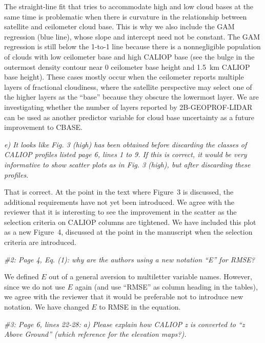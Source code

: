 \documentclass[12pt,a4paper]{responses}
\begin{document}
The straight-line fit that tries to accommodate high and low cloud bases at the
same time is problematic when there is curvature in the relationship between
satellite and ceilometer cloud base.  This is why we also include the GAM
regression (blue line), whose slope and intercept need not be constant.  The GAM
regression is still below the 1-to-1 line because there is a nonnegligible
population of clouds with low ceilometer base and high CALIOP base (see the
bulge in the outermost density contour near 0 ceilometer base height and 1.5~km
CALIOP base height).  These cases mostly occur when the ceilometer reports
multiple layers of fractional cloudiness, where the satellite perspective may
select one of the higher layers as the ``base'' because they obscure the
lowermost layer.  We are investigating whether the number of layers reported by
2B-GEOPROF-LIDAR can be used as another predictor variable for cloud base
uncertainty as a future improvement to CBASE.

\textit{e) It looks like Fig.  3 (high) has been obtained before discarding the
  classes of CALIOP profiles listed page 6, lines 1 to 9.  If this is correct,
  it would be very informative to show scatter plots as in Fig. 3 (high), but
  after discarding these profiles.}

That is correct.  At the point in the text where Figure~3 is discussed, the
additional requirements have not yet been introduced.  We agree with the
reviewer that it is interesting to see the improvement in the scatter as the
selection criteria on CALIOP columns are tightened.  We have included this plot
as a new Figure~4, discussed at the point in the manuscript when the selection
criteria are introduced.

\textit{\#2: Page 4, Eq. (1): why are the authors using a new notation “E” for
  RMSE?}

We defined $E$ out of a general aversion to multiletter variable names.
However, since we do not use $E$ again (and use ``RMSE'' as column heading in
the tables), we agree with the reviewer that it would be preferable not to
introduce new notation.  We have changed $E$ to RMSE in the equation.

\textit{\#3:  Page 6, lines 22-28:  a) Please explain how CALIOP z is converted to “z Above
Ground” (which reference for the elevation maps?).}
\end{document}

